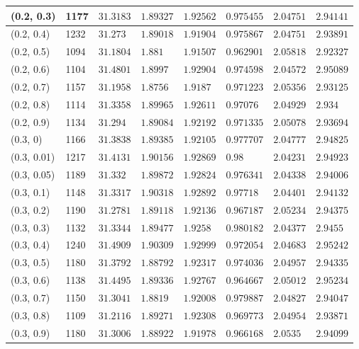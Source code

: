 \begin{center}
{\begin{longtable}{| l | p{} |  p{} | p{} | p{} | p{} | p{} | p{} |}
 (0.2, 0.3) & 1177  & $31.3183$ & $1.89327$ & $1.92562$ & $0.975455$ & $2.04751$ & $2.94141$ \\ \hline
 (0.2, 0.4) & 1232  & $31.273$ & $1.89018$ & $1.91904$ & $0.975867$ & $2.04751$ & $2.93891$ \\ \hline
 (0.2, 0.5) & 1094  & $31.1804$ & $1.881$ & $1.91507$ & $0.962901$ & $2.05818$ & $2.92327$ \\ \hline
 (0.2, 0.6) & 1104  & $31.4801$ & $1.8997$ & $1.92904$ & $0.974598$ & $2.04572$ & $2.95089$ \\ \hline
 (0.2, 0.7) & 1157  & $31.1958$ & $1.8756$ & $1.9187$ & $0.971223$ & $2.05356$ & $2.93125$ \\ \hline
 (0.2, 0.8) & 1114  & $31.3358$ & $1.89965$ & $1.92611$ & $0.97076$ & $2.04929$ & $2.934$ \\ \hline
 (0.2, 0.9) & 1134  & $31.294$ & $1.89084$ & $1.92192$ & $0.971335$ & $2.05078$ & $2.93694$ \\ \hline
 (0.3, 0) & 1166  & $31.3838$ & $1.89385$ & $1.92105$ & $0.977707$ & $2.04777$ & $2.94825$ \\ \hline
 (0.3, 0.01) & 1217  & $31.4131$ & $1.90156$ & $1.92869$ & $0.98$ & $2.04231$ & $2.94923$ \\ \hline
 (0.3, 0.05) & 1189  & $31.332$ & $1.89872$ & $1.92824$ & $0.976341$ & $2.04338$ & $2.94006$ \\ \hline
 (0.3, 0.1) & 1148  & $31.3317$ & $1.90318$ & $1.92892$ & $0.97718$ & $2.04401$ & $2.94132$ \\ \hline
 (0.3, 0.2) & 1190  & $31.2781$ & $1.89118$ & $1.92136$ & $0.967187$ & $2.05234$ & $2.94375$ \\ \hline
 (0.3, 0.3) & 1132  & $31.3344$ & $1.89477$ & $1.9258$ & $0.980182$ & $2.04377$ & $2.9455$ \\ \hline
 (0.3, 0.4) & 1240  & $31.4909$ & $1.90309$ & $1.92999$ & $0.972054$ & $2.04683$ & $2.95242$ \\ \hline
 (0.3, 0.5) & 1180  & $31.3792$ & $1.88792$ & $1.92317$ & $0.974036$ & $2.04957$ & $2.94335$ \\ \hline
 (0.3, 0.6) & 1138  & $31.4495$ & $1.89336$ & $1.92767$ & $0.964667$ & $2.05012$ & $2.95234$ \\ \hline
 (0.3, 0.7) & 1150  & $31.3041$ & $1.8819$ & $1.92008$ & $0.979887$ & $2.04827$ & $2.94047$ \\ \hline
 (0.3, 0.8) & 1109  & $31.2116$ & $1.89271$ & $1.92308$ & $0.969773$ & $2.04954$ & $2.93871$ \\ \hline
 (0.3, 0.9) & 1180  & $31.3006$ & $1.88922$ & $1.91978$ & $0.966168$ & $2.0535$ & $2.94099$ \\ \hline

\end{longtable}}
\end{center}
